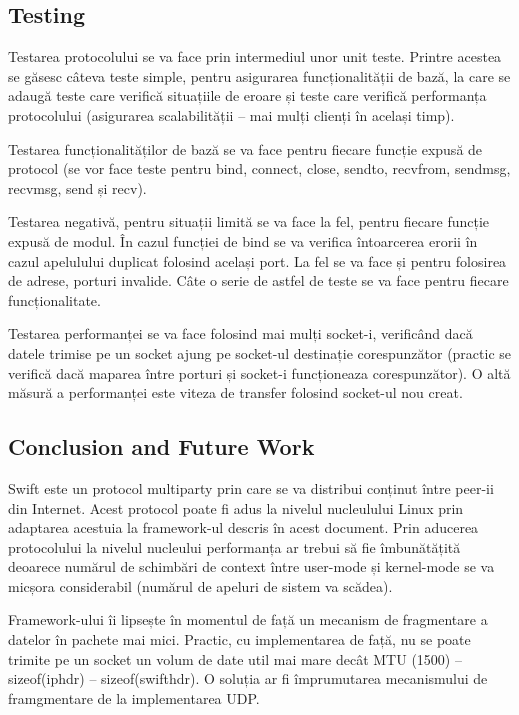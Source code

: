 \subsection{Testing}

Testarea protocolului se va face prin intermediul unor unit teste.
Printre acestea se găsesc câteva teste simple, pentru asigurarea
funcționalității de bază, la care se adaugă teste care verifică situațiile de
eroare și teste care verifică performanța protocolului (asigurarea
scalabilității – mai mulți clienți în același timp).

Testarea funcționalităților de bază se va face pentru fiecare funcție
expusă de protocol (se vor face teste pentru bind, connect, close,
sendto, recvfrom, sendmsg, recvmsg, send și recv).

Testarea negativă, pentru situații limită se va face la fel, pentru fiecare
funcție expusă de modul. În cazul funcției de bind se va verifica întoarcerea
erorii în cazul apelulului duplicat folosind același port. La fel se va face
și pentru folosirea de adrese, porturi invalide. Câte o serie de astfel de
teste se va face pentru fiecare funcționalitate.

Testarea performanței se va face folosind mai mulți socket-i,
verificând dacă datele trimise pe un socket ajung pe socket-ul destinație
corespunzător (practic se verifică dacă maparea între porturi și socket-i
funcționeaza corespunzător). O altă măsură a performanței este viteza de
transfer folosind socket-ul nou creat.

\subsection{Conclusion and Future Work}

Swift este un protocol multiparty prin care se va distribui conținut între
peer-ii din Internet. Acest protocol poate fi adus la nivelul nucleulului
Linux prin adaptarea acestuia la framework-ul descris în acest document. Prin
aducerea protocolului la nivelul nucleului performanța ar trebui să fie
îmbunătățită deoarece numărul de schimbări de context între user-mode și
kernel-mode se va micșora considerabil (numărul de apeluri de sistem va
scădea).

Framework-ului îi lipsește în momentul de față un mecanism de fragmentare a
datelor în pachete mai mici. Practic, cu implementarea de față, nu se poate
trimite pe un socket un volum de date util mai mare decât MTU (1500) –
sizeof(iphdr) – sizeof(swifthdr). O soluția ar fi împrumutarea mecanismului de
framgmentare de la implementarea UDP.
